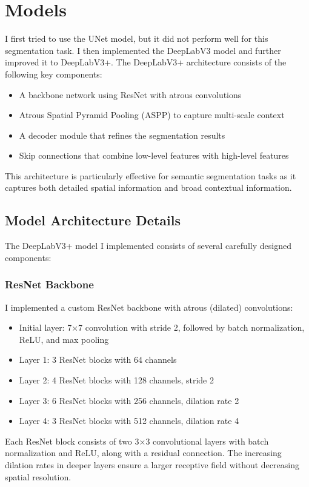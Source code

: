 \documentclass[]{article}
\begin{document}
\section{Models}\label{sec:Models}
I first tried to use the UNet model, but it did not perform well for this segmentation task. I then implemented the DeepLabV3 model and further improved it to DeepLabV3+. The DeepLabV3+ architecture consists of the following key components:

\begin{itemize}
    \item A backbone network using ResNet with atrous convolutions
    \item Atrous Spatial Pyramid Pooling (ASPP) to capture multi-scale context
    \item A decoder module that refines the segmentation results
    \item Skip connections that combine low-level features with high-level features
\end{itemize}

This architecture is particularly effective for semantic segmentation tasks as it captures both detailed spatial information and broad contextual information.

\subsection{Model Architecture Details}
The DeepLabV3+ model I implemented consists of several carefully designed components:

\subsubsection{ResNet Backbone}
I implemented a custom ResNet backbone with atrous (dilated) convolutions:
\begin{itemize}
    \item Initial layer: 7×7 convolution with stride 2, followed by batch normalization, ReLU, and max pooling
    \item Layer 1: 3 ResNet blocks with 64 channels
    \item Layer 2: 4 ResNet blocks with 128 channels, stride 2
    \item Layer 3: 6 ResNet blocks with 256 channels, dilation rate 2
    \item Layer 4: 3 ResNet blocks with 512 channels, dilation rate 4
\end{itemize}

Each ResNet block consists of two 3×3 convolutional layers with batch normalization and ReLU, along with a residual connection. The increasing dilation rates in deeper layers ensure a larger receptive field without decreasing spatial resolution.
\end{document}
